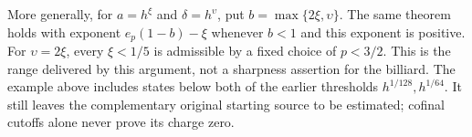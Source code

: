 More generally, for $a=h^\xi$ and $\delta=h^\upsilon$, put
$b=\max\{2\xi,\upsilon\}$. The same theorem holds with exponent
$e_p(1-b)-\xi$ whenever $b<1$ and this exponent is positive.
For $\upsilon=2\xi$, every $\xi<1/5$ is admissible by a fixed
choice of $p<3/2$. This is the range delivered by this argument,
not a sharpness assertion for the billiard. The example above includes
states below both of the earlier thresholds $h^{1/128},h^{1/64}$.
It still leaves the complementary original starting source to be
estimated; cofinal cutoffs alone never prove its charge zero.
